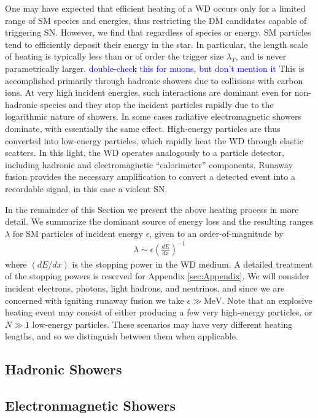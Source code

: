 \documentclass[twocolumn, preprintnumbers,amsmath,amssymb,prd, superscriptaddress]{revtex4}
\def\r{\right)}
\def\l{\left(}
\begin{document}
One may have expected that efficient heating of a WD occurs only for a limited range of SM species and energies, thus restricting the DM candidates capable of triggering SN. 
However, we find that regardless of species or energy, SM particles tend to efficiently deposit their energy in the star.
In particular, the length scale of heating is typically less than or of order the trigger size $\lambda_T$, and is never parametrically larger.
\textcolor{blue}{double-check this for muons, but don't mention it}
This is accomplished primarily through hadronic showers due to collisions with carbon ions.
At very high incident energies, such interactions are dominant even for non-hadronic species and they stop the incident particles rapidly due to the logarithmic nature of showers.
In some cases radiative electromagnetic showers dominate, with essentially the same effect.
High-energy particles are thus converted into low-energy particles, which rapidly heat the WD through elastic scatters.  
In this light, the WD operates analogously to a particle detector, including hadronic and electromagnetic ``calorimeter'' components.
Runaway fusion provides the necessary amplification to convert a detected event into a recordable signal, in this case a violent SN.

In the remainder of this Section we present the above heating process in more detail.
We summarize the dominant source of energy loss and the resulting ranges $\lambda$ for SM particles of incident energy $\epsilon$, given to an order-of-magnitude by
\begin{align}
    \lambda \sim \epsilon \l\frac{dE}{dx}\r^{-1}
\end{align}
where $(dE/dx)$ is the stopping power in the WD medium.  
A detailed treatment of the stopping powers is reserved for Appendix \ref{sec:Appendix}. 
We will consider incident electrons, photons, light hadrons, and neutrinos, and since we are concerned with igniting runaway fusion we take $\epsilon \gg \text{MeV}$. 
Note that an explosive heating event may consist of either producing a few very high-energy particles, or $N \gg 1$ low-energy particles.
These scenarios may have very different heating lengths, and so we distinguish between them when applicable.

\subsection{Hadronic Showers}

\subsection{Electronmagnetic Showers}
\end{document}
